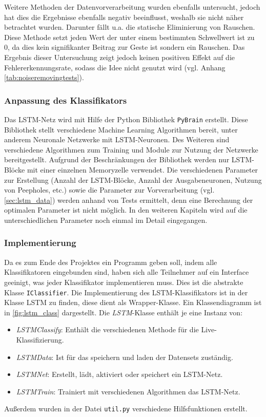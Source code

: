 Weitere Methoden der Datenvorverarbeitung wurden ebenfalls untersucht, jedoch
hat dies die Ergebnisse ebenfalls negativ beeinflusst, weshalb sie nicht näher
betrachtet wurden. Darunter fällt u.a. die statische Eliminierung von Rauschen.
Diese Methode setzt jeden Wert der unter einem bestimmten Schwellwert ist zu 0,
da dies kein signifikanter Beitrag zur Geste ist sondern ein Rauschen. Das
Ergebnis dieser Untersuchung zeigt jedoch keinen positiven Effekt auf die Fehlererkennungsrate, sodass die Idee nicht
genutzt wird (vgl. Anhang \autoref{tab:noiseremovingtests}).
 
\subsubsection{Anpassung des Klassifikators}
Das \ac{LSTM}-Netz wird mit Hilfe der Python Bibliothek \texttt{PyBrain}
\cite{schaul2010} erstellt. Diese Bibliothek stellt verschiedene Machine
Learning Algorithmen bereit, unter anderem Neuronale Netzwerke mit
\ac{LSTM}-Neuronen. Des Weiteren sind verschiedene Algorithmen zum Training und
Module zur Nutzung der Netzwerke bereitgestellt. Aufgrund der Beschränkungen der
Bibliothek werden nur \ac{LSTM}-Blöcke mit einer einzelnen Memoryzelle
verwendet. Die verschiedenen Parameter zur Erstellung (Anzahl der
\ac{LSTM}-Blöcke, Anzahl der Ausgabeneuronen, Nutzung von Peepholes, etc.) sowie
die Parameter zur Vorverarbeitung (vgl. \autoref{sec:lstm_data}) werden anhand
von Tests ermittelt, denn eine Berechnung der optimalen Parameter ist nicht
möglich. In den weiteren Kapiteln wird auf die unterschiedlichen Parameter noch
einmal im Detail eingegangen. 


\subsubsection{Implementierung}
Da es zum Ende des Projektes ein Programm geben soll, indem alle Klassifikatoren
eingebunden sind, haben sich alle Teilnehmer auf ein Interface geeinigt, was
jeder Klassifikator implementieren muss. Dies ist die abstrakte Klasse
\texttt{IClassifier}. Die Implementierung des \ac{LSTM}-Klassifikators ist in
der Klasse LSTM zu finden, diese dient als Wrapper-Klasse. Ein Klassendiagramm
ist in \autoref{fig:lstm_class} dargestellt. Die \textit{LSTM}-Klasse enthält je eine Instanz von: 
\begin{itemize}
\item \textit{LSTMClassify}: Enthält die verschiedenen Methode für die Live-Klassifizierung.
\item \textit{LSTMData}: Ist für das speichern und laden der Datensets zuständig.
\item \textit{LSTMNet}: Erstellt, lädt, aktiviert oder speichert ein LSTM-Netz.
\item \textit{LSTMTrain}: Trainiert mit verschiedenen Algorithmen das LSTM-Netz.
\end{itemize}
Außerdem wurden in der Datei \texttt{util.py} verschiedene Hilfsfunktionen
erstellt.

